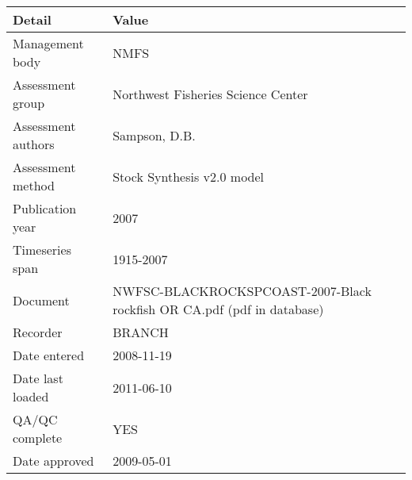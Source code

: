 \begin{table}[htb]
\centering
\begin{tabular}{lp{7cm}}
\toprule
Detail & Value \\
\midrule
Management body    & NMFS                                                                   \\
Assessment group   & Northwest Fisheries Science Center                                     \\
Assessment authors & Sampson, D.B.                                                          \\
Assessment method  & Stock Synthesis v2.0 model                                             \\
Publication year   & 2007                                                                   \\
Timeseries span    & 1915-2007                                                              \\
Document           & NWFSC-BLACKROCKSPCOAST-2007-Black rockfish OR CA.pdf (pdf in database) \\
Recorder           & BRANCH                                                                 \\
Date entered       & 2008-11-19                                                             \\
Date last loaded   & 2011-06-10                                                             \\
QA/QC complete     & YES                                                                    \\
Date approved      & 2009-05-01                                                             \\
\bottomrule
\end{tabular}
\label{tab:assessdet}
\end{table}
